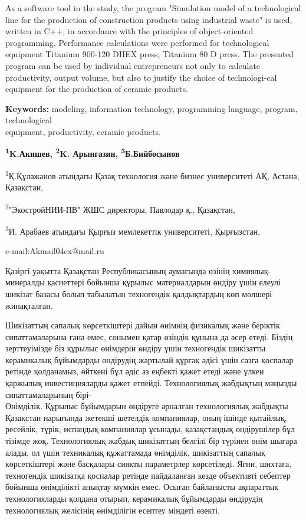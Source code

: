 As a software tool in the study, the program "Simulation model of a
technological line for the production of construction products using
industrial waste" is used, written in C++, in accordance with the
principles of object-oriented programming. Performance calculations were
performed for technological equipment Titanium 900-120 DHEX press,
Titanium 80 D press. The presented program can be used by individual
entrepreneurs not only to calculate productivity, output volume, but
also to justify the choice of technologi-cal equipment for the production
of ceramic products.

{\bfseries Keywords:} modeling, information technology, programming
language, program, technological \\equipment, productivity, ceramic
products.


\begin{center}
{\bfseries \textsuperscript{1}K.Акишев\envelope,
\textsuperscript{2}K. Арынгазин, \textsuperscript{3}Б.Бийбосынов}

\textsuperscript{1}Қ.Құлажанов атындағы Қазақ технология және бизнес
университеті АҚ, Астана, Қазақстан,

\textsuperscript{2}"ЭкостройНИИ-ПВ" ЖШС директоры, Павлодар қ.,
Қазақстан,

\textsuperscript{3}И. Арабаев атындағы Қырғыз мемлекеттік университеті,
Қырғызстан,

e-mail:Akmail04cx@mail.ru
\end{center}

Қазіргі уақытта Қазақстан Республикасының аумағында өзінің
химиялық-минералды қасиеттері бойынша құрылыс материалдарын өндіру үшін
елеулі шикізат базасы болып табылатын техногендік қалдықтардың көп
мөлшері жинақталған.

Шикізаттың сапалық көрсеткіштері дайын өнімнің физикалық және беріктік
сипаттамаларына ғана емес, сонымен қатар өзіндік құнына да әсер етеді.
Біздің зерттеуімізде біз құрылыс өнімдерін өндіру үшін техногендік
шикізатты керамикалық бұйымдарды өндірудің жартылай құрғақ әдісі үшін
сазға қоспалар ретінде қолданамыз, өйткені бұл әдіс аз еңбекті қажет
етеді және үлкен қаржылық инвестицияларды қажет етпейді. Технологиялық
жабдықтың маңызды сипаттамаларының бірі-\\Өнімділік. Құрылыс бұйымдарын
өндіруге арналған технологиялық жабдықты Қазақстан нарығында жетекші
шетелдік компаниялар, оның ішінде қытайлық, ресейлік, түрік, испандық
компаниялар ұсынады, қазақстандық өндірушілер бұл тізімде жоқ.
Технологиялық жабдық шикізаттың белгілі бір түрінен өнім шығара алады,
ол үшін техникалық құжаттамада өнімділік, шикізаттың сапалық
көрсеткіштері және басқалары сияқты параметрлер көрсетіледі. Яғни,
шихтаға, техногендік шикізатқа қоспалар ретінде пайдаланған кезде
объективті себептер бойынша өнімділікті анықтау мүмкін емес. Осыған
байланысты ақпараттық технологияларды қолдана отырып, керамикалық
бұйымдарды өндірудің технологиялық желісінің өнімділігін есептеу міндеті
өзекті.

